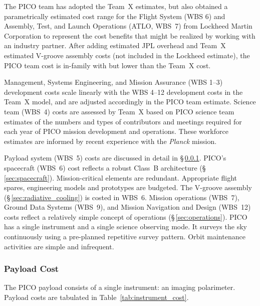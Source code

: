 The PICO team has adopted the Team~X estimates, but also obtained a parametrically estimated cost range for the Flight System (WBS 6) and Assembly, Test, and Launch Operations (ATLO, WBS~7) from Lockheed Martin Corporation to represent the cost benefits that might be realized by working with an industry partner. After adding estimated JPL overhead and Team~X estimated V-groove assembly costs (not included in the Lockheed estimate), the PICO team cost is in-family with but lower than the Team~X cost.

Management, Systems Engineering, and Mission Assurance (WBS 1--3)
development costs scale linearly with the WBS 4--12 development costs
in the Team~X model, and are adjusted accordingly in the PICO team
estimate. Science team (WBS~4) costs are assessed by Team~X based on PICO
science team estimates of the numbers and types of contributors and
meetings required for each year of PICO mission development and
operations. These workforce estimates are informed by recent
experience with the \textit{Planck} mission.

Payload system (WBS~5) costs are discussed in detail in
\S\,\ref{sec:instrument_cost}.  PICO's spacecraft (WBS~6) cost
reflects a robust Class~B architecture
(\S\,\ref{sec:spacecraft}). Mission-critical elements are
redundant. Appropriate flight spares, engineering models and
prototypes are budgeted. The V-groove assembly (\S\,\ref{sec:radiative_cooling})
is costed in WBS~6.  Mission operations (WBS~7), Ground Data Systems
(WBS~9), and Mission Navigation and Design (WBS~12) costs reflect a
relatively simple concept of operations (\S\,\ref{sec:operations}). PICO has a single
instrument and a single science observing mode. It surveys the sky
continuously using a pre-planned repetitive survey pattern. Orbit
maintenance activities are simple and infrequent.

\subsubsection{Payload Cost}
\label{sec:instrument_cost} %



The PICO payload consists of a single instrument: an imaging
polarimeter. Payload costs are tabulated in
Table~\ref{tab:instrument_cost}.

